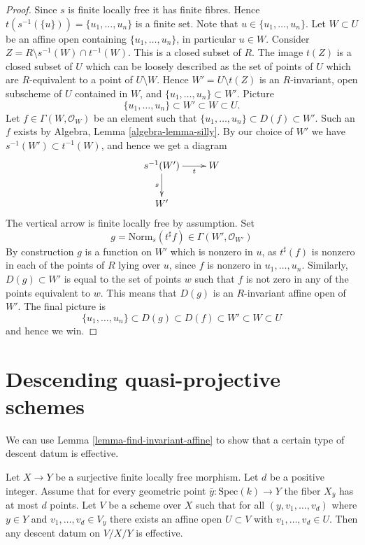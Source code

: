 \begin{proof}
Since $s$ is finite locally free it has finite fibres. Hence
$t(s^{-1}(\{u\})) = \{u_1, \ldots, u_n\}$ is a finite set.
Note that $u \in \{u_1, \ldots, u_n\}$.
Let $W \subset U$ be an affine open containing $\{u_1, \ldots, u_n\}$,
in particular $u \in W$. Consider
$Z = R \setminus s^{-1}(W) \cap t^{-1}(W)$. This is a closed subset
of $R$. The image $t(Z)$ is a closed subset of $U$ which can be loosely
described as the set of points of $U$ which are $R$-equivalent to a point
of $U \setminus W$. Hence $W' = U \setminus t(Z)$ is an $R$-invariant, open
subscheme of $U$ contained in $W$, and $\{u_1, \ldots, u_n\} \subset W'$.
Picture
$$
\{u_1, \ldots, u_n\} \subset W' \subset W \subset U.
$$
Let $f \in \Gamma(W, \mathcal{O}_W)$ be an element such that
$\{u_1, \ldots, u_n\} \subset D(f) \subset W'$. Such an $f$ exists by
Algebra, Lemma \ref{algebra-lemma-silly}. By our choice of $W'$ we
have $s^{-1}(W') \subset t^{-1}(W)$, and hence we get a diagram
$$
\xymatrix{
s^{-1}(W') \ar[d]_s \ar[r]_-t & W \\
W'
}
$$
The vertical arrow is finite locally free by assumption. Set
$$
g = \text{Norm}_s(t^\sharp f) \in \Gamma(W', \mathcal{O}_{W'})
$$
By construction $g$ is a function on $W'$ which is
nonzero in $u$, as $t^\sharp(f)$ is nonzero in each of the points of
$R$ lying over $u$, since $f$ is nonzero in $u_1, \ldots, u_n$.
Similarly, $D(g) \subset W'$ is equal to the
set of points $w$ such that $f$ is not zero in any of the points
equivalent to $w$. This means that $D(g)$ is an
$R$-invariant affine open of $W'$. The final picture is
$$
\{u_1, \ldots, u_n\} \subset D(g) \subset D(f) \subset W' \subset W \subset U
$$
and hence we win.
\end{proof}







\section{Descending quasi-projective schemes}
\label{section-quasi-projective}

\noindent
We can use Lemma \ref{lemma-find-invariant-affine}
to show that a certain type of descent datum is effective.

\begin{lemma}
\label{lemma-descend-along-finite-with-bound}
Let $X \to Y$ be a surjective finite locally free morphism.
Let $d$ be a positive integer. Assume that for every geometric
point $\bar{y} : \mathrm{Spec}(k) \to Y$ the fiber $X_{\bar{y}}$
has at most $d$ points.
Let $V$ be a scheme over $X$ such that for all
$(y, v_1, \ldots, v_d)$ where $y \in Y$ and
$v_1, \ldots, v_d \in V_y$ there exists an affine open
$U \subset V$ with $v_1, \ldots, v_d \in U$.
Then any descent datum on $V/X/Y$ is effective.
\end{lemma}

